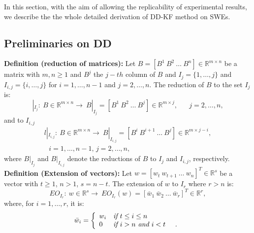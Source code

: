 \documentclass[smallcondensed]{svjour3}
\begin{document}
In this section, with the aim of allowing the replicability of experimental results, we describe the the whole detailed derivation of DD-KF method on  SWEs.  




\subsection{Preliminaries on DD}

\noindent \textbf{Definition (reduction of matrices):}
Let $B=[B^{1} \ B^{2} \ \ldots \ B^{n}] \in \mathbb{R}^{m \times n}$ be a matrix with $m,n\ge 1$ and $B^{j}$ the $j-th$ column of $B$ and $I_{j}=\{1,\ldots,j\}$ and $I_{i,j}=\{i,\ldots,j\}$ for $i=1,\ldots,n-1$ and $j=2,\ldots,n$. The reduction of $B$ to the set $I_{j}$ is:
\begin{equation}
|_{I_{j}}: \ B\in \mathbb{R}^{m\times n} \rightarrow \ B|_{ I_{j}}=[B^{1} \ B^{2} \ \ldots \ B^{j}]\in \mathbb{R}^{m \times j}, \quad \textit{ $j=2,\ldots,n$},
\end{equation}
and to $I_{i,j}$
\begin{eqnarray}{l}
|_{ I_{i,j}}: \ B\in \mathbb{R}^{m\times n} \rightarrow \ B|_{ I_{i,j}}=[B^{i} \ B^{i+1} \ \ldots \ B^{j}]\in \mathbb{R}^{m \times j-i},  \\ 
\textit{ $i=1,\ldots,n-1$, $j=2,\ldots,n$}, 
\end{eqnarray}
where $B|_{ I_{j}}$ and $B|_{ I_{i,j}}$ denote the reductions of  $B$ to $I_{j}$ and $I_{i,j}$, respectively.\\[.2cm]
\textbf{Definition (Extension  of vectors):}
Let $w=[w_{t} \ w_{t+1} \ \ldots \ w_{n}]^{T} \in \mathbb{R}^{s}$ be a vector with $t\ge 1$, $n>1$, $s=n-t$. The extension  of $w$  to  $I_{r}$ where $r>n$ is:
\begin{equation}
EO_{I_{r}}: \ w\in \mathbb{R}^{s} \rightarrow \ EO_{I_{r}}(w)=[\bar{w}_{1} \ \bar{w}_{2} \ \ldots \ \bar{w}_{r}]^{T} \in \mathbb{R}^{r},
\end{equation}
where, for $i=1,\ldots,r$, it is: 
\begin{equation}
\bar{w}_{i} =\left\{ \begin{array}{ll} 
w_{i} & \textit{if $t\le i\le n$}\\
0 & \textit{if $i> n$ and $i<t$ \quad .}\\
\end{array} \right.
\end{equation}
\end{document}
